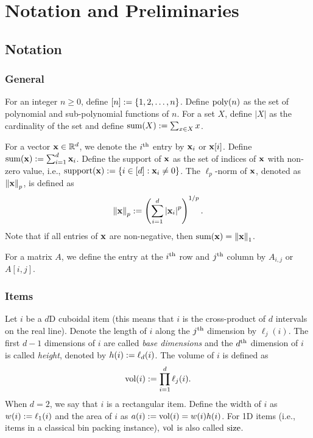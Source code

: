 \chapter{Notation and Preliminaries}
\label{chap:preliminaries}

\section{Notation}

\subsection{General}

For an integer $n \ge 0$, define $[n] := \{1, 2, \ldots, n\}$.
Define $\operatorname{poly}(n)$ as the set of polynomial and sub-polynomial functions of $n$.
For a set $X$, define $|X|$ as the cardinality of the set
and define $\operatorname{sum}(X) := \sum_{x \in X} x$.

For a vector $\mathbf{x} \in \mathbb{R}^d$, we denote the $i^{\textrm{th}}$ entry by $\mathbf{x}_i$ or $\mathbf{x}[i]$.
Define $\operatorname{sum}(\mathbf{x}) := \sum_{i=1}^d \mathbf{x}_i$.
Define the support of $\mathbf{x}$ as the set of indices of $\mathbf{x}$ with non-zero value,
i.e., $\operatorname{support}(\mathbf{x}) := \{i \in [d]: \mathbf{x}_i \neq 0\}$.
The $\ell_p$-norm of $\mathbf{x}$, denoted as $\left\lVert \mathbf{x} \right\rVert_p$, is defined as
\[ \left\lVert \mathbf{x} \right\rVert_p := \left( \sum_{i=1}^d \left\lvert \mathbf{x}_i \right\rvert^p \right)^{1/p}. \]
Note that if all entries of $\mathbf{x}$ are non-negative, then $\operatorname{sum}(\mathbf{x}) = \left\lVert \mathbf{x} \right\rVert_1$.

For a matrix $A$, we define the entry at the $i^{\textrm{th}}$ row and $j^{\textrm{th}}$ column
by $A_{i,j}$ or $A[i, j]$.

\subsection{Items}
\label{sec:preliminaries:items}

Let $i$ be a $d$D cuboidal item
(this means that $i$ is the cross-product of $d$ intervals on the real line).
Denote the length of $i$ along the $j^{\textrm{th}}$ dimension by $\ell_j(i)$.
The first $d-1$ dimensions of $i$ are called \emph{base dimensions}
and the $d^{\textrm{th}}$ dimension of $i$ is called \emph{height}, denoted by $h(i) := \ell_d(i)$.
The volume of $i$ is defined as
\[ \operatorname{vol}(i) := \prod_{i=1}^d \ell_j(i). \]
When $d=2$, we say that $i$ is a rectangular item.
Define the width of $i$ as $w(i) := \ell_1(i)$
and the area of $i$ as $a(i) := \operatorname{vol}(i) = w(i)h(i)$.
For 1D items (i.e., items in a classical bin packing instance),
$\operatorname{vol}$ is also called $\operatorname{size}$.

